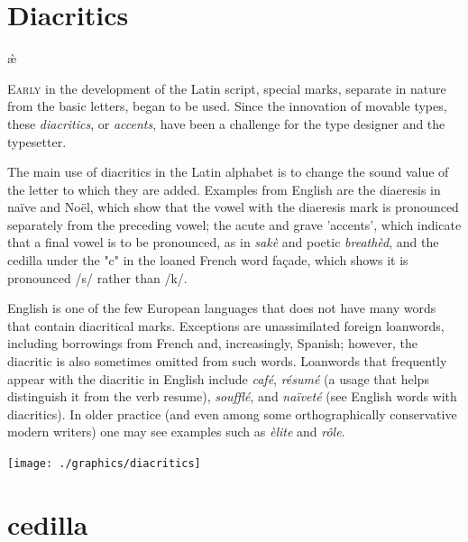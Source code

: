 \section{Diacritics}

{\Huge\`{\ae}}

\begin{multicols}{2}
\lettrine{E}{arly} in the development of the Latin script, special marks, separate in nature from the basic letters, began to be used. Since the innovation of movable types, these \textit{diacritics}, or \textit{accents},
have been a challenge for the type designer and the typesetter. 

The main use of diacritics in the Latin alphabet is to change the sound value of the letter to which they are added. Examples from English are the diaeresis in na\"{i}ve and No\"el, which show that the vowel with the diaeresis mark is pronounced separately from the preceding vowel; the acute and grave 'accents', which indicate that a final vowel is to be pronounced, as in \textit{sak\`e} and poetic \textit{breath\`ed}, and the cedilla under the "c" in the loaned French word fa\c cade, which shows it is pronounced /s/ rather than /k/.

English is one of the few European languages that does not have many words that contain diacritical marks. Exceptions are unassimilated foreign loanwords, including borrowings from French and, increasingly, Spanish; however, the diacritic is also sometimes omitted from such words. Loanwords that frequently appear with the diacritic in English include \textit{caf\'e}, \textit{r\'esum\'e} (a usage that helps distinguish it from the verb resume), \textit{souffl\'e}, and \textit{na\"ivet\'e} (see English words with diacritics). In older practice (and even among some orthographically conservative modern writers) one may see examples such as \textit{\`elite} and \textit{r\^ole}.

\columnbreak

\texttt{[image: ./graphics/diacritics]}
  \label{fig:visigothic}
\end{multicols}






\section*{cedilla}
 

